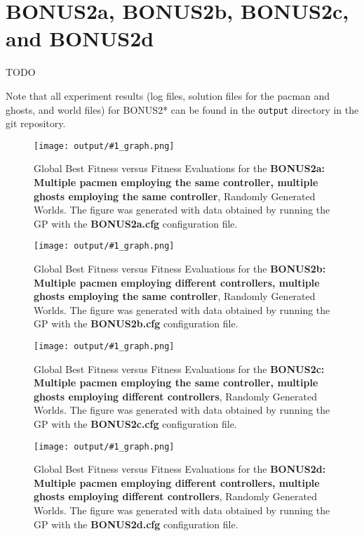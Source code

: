 \documentclass[11pt]{article}
\newcommand{\fitnessplotcaption}[2]{\caption{Global Best Fitness versus Fitness Evaluations for the \textbf{{#1}}, Randomly Generated Worlds. The figure was generated with data obtained by running the GP with the \textbf{{#2}} configuration file.}}
\newcommand{\addgraphic}[1]{\centerline{\texttt{[image: output/\#1\_graph.png]}}}
\begin{document}
\section{BONUS2a, BONUS2b, BONUS2c, and BONUS2d}
TODO

Note that all experiment results (log files, solution files for the pacman and ghosts, and world files) for BONUS2* can be
found in the \texttt{output} directory in the git repository.

\begin{figure}[H]
    \addgraphic{BONUS2a}
    \fitnessplotcaption{BONUS2a: Multiple pacmen employing the same controller, multiple ghosts employing the same controller}{BONUS2a.cfg}
    \label{fig:BONUS2a}
\end{figure}

\begin{figure}[H]
    \addgraphic{BONUS2b}
    \fitnessplotcaption{BONUS2b: Multiple pacmen employing different controllers, multiple ghosts employing the same controller}{BONUS2b.cfg}
    \label{fig:BONUS2b}
\end{figure}

\begin{figure}[H]
    \addgraphic{BONUS2c}
    \fitnessplotcaption{BONUS2c: Multiple pacmen employing the same controller, multiple ghosts employing different controllers}{BONUS2c.cfg}
    \label{fig:BONUS2c}
\end{figure}

\begin{figure}[H]
    \addgraphic{BONUS2d}
    \fitnessplotcaption{BONUS2d: Multiple pacmen employing different controllers, multiple ghosts employing different controllers}{BONUS2d.cfg}
    \label{fig:BONUS2d}
\end{figure}
\end{document}
